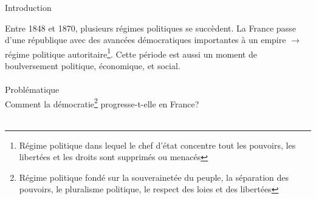 \documentclass[12pt,a4paper]{article}
\begin{document}
\begin{center}
        \shadowbox{\begin{large}
                \textcolor{black}{Les transformations politiques et sociales de la France $(1848-1870)$ }
        \end{large}}
    \end{center}
    \vspace{0.5 cm}
Introduction

	Entre 1848 et 1870, plusieurs régimes politiques se succèdent. 
	La France passe d'une république avec des avancées démocratiques importantes à un empire $\to$ régime politique autoritaire\footnote{Régime politique dans lequel le chef d'état concentre tout les pouvoirs, les libertées et les droits sont supprimés ou menacés}. 
	Cette période est aussi un moment de boulversement politique, économique, et social.\\ \\

 Problématique \\
	Comment la démocratie\footnote{Régime politique fondé sur la souverainetée du peuple, la séparation des pouvoirs, le pluralisme politique, le respect des loies et des libertées} progresse-t-elle en France? \\ \\
\end{document}
